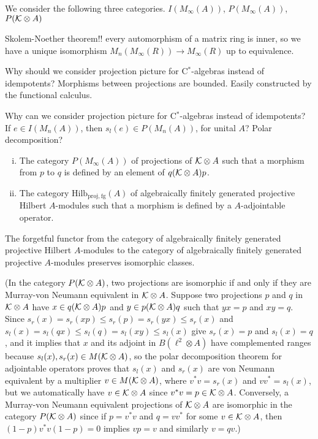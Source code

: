 \documentclass{../../large}
\begin{document}
\begin{prb}
We consider the following three categories.
$I(M_\infty(A))$, $P(M_\infty(A))$, $P(\mathcal{K}\otimes A)$

Skolem-Noether theorem!! every automorphism of a matrix ring is inner, so we have a unique isomorphism $M_n(M_\infty(R))\to M_\infty(R)$ up to equivalence.

Why should we consider projection picture for C$^*$-algebras instead of idempotents?
Morphisms between projections are bounded.
Easily constructed by the functional calculus.

Why can we consider projection picture for C$^*$-algebras instead of idempotents?
If $e\in I(M_n(A))$, then $s_l(e)\in P(M_n(A))$, for unital $A$?
Polar decomposition?



\begin{enumerate}[(i)]
\item The category $P(M_\infty(A))$ of projections of $\mathcal{K}\otimes A$ such that a morphism from $p$ to $q$ is defined by an element of $q(\mathcal{K}\otimes A)p$.
\item The category $\mathrm{Hilb}_{\mathrm{proj,fg}}(A)$ of algebraically finitely generated projective Hilbert $A$-modules such that a morphism is defined by a $A$-adjointable operator.
\end{enumerate}
The forgetful functor from the category of algebraically finitely generated projective Hilbert $A$-modules to the category of algebraically finitely generated projective $A$-modules preserves isomorphic classes.

(In the category $P(\mathcal{K}\otimes A)$, two projections are isomorphic if and only if they are Murray-von Neumann equivalent in $\mathcal{K}\otimes A$.
Suppose two projections $p$ and $q$ in $\mathcal{K}\otimes A$ have $x\in q(\mathcal{K}\otimes A)p$ and $y\in p(\mathcal{K}\otimes A)q$ such that $yx=p$ and $xy=q$.
Since $s_r(x)=s_r(xp)\le s_r(p)=s_r(yx)\le s_r(x)$ and $s_l(x)=s_l(qx)\le s_l(q)=s_l(xy)\le s_l(x)$ give $s_r(x)=p$ and $s_l(x)=q$, and it implies that $x$ and its adjoint in $B(\ell^2\otimes A)$ have complemented ranges because $s_l(x),s_r(x)\in M(\mathcal{K}\otimes A)$, so the polar decomposition theorem for adjointable operators proves that $s_l(x)$ and $s_r(x)$ are von Neumann equivalent by a multiplier $v\in M(\mathcal{K}\otimes A)$, where $v^*v=s_r(x)$ and $vv^*=s_l(x)$, but we automatically have $v\in\mathcal{K}\otimes A$ since $v^*v=p\in\mathcal{K}\otimes A$.
Conversely, a Murray-von Neumann equivalent projections of $\mathcal{K}\otimes A$ are isomorphic in the category $P(\mathcal{K}\otimes A)$ since if $p=v^*v$ and $q=vv^*$ for some $v\in\mathcal{K}\otimes A$, then $(1-p)v^*v(1-p)=0$ implies $vp=v$ and similarly $v=qv$.)


\end{prb}
\end{document}
